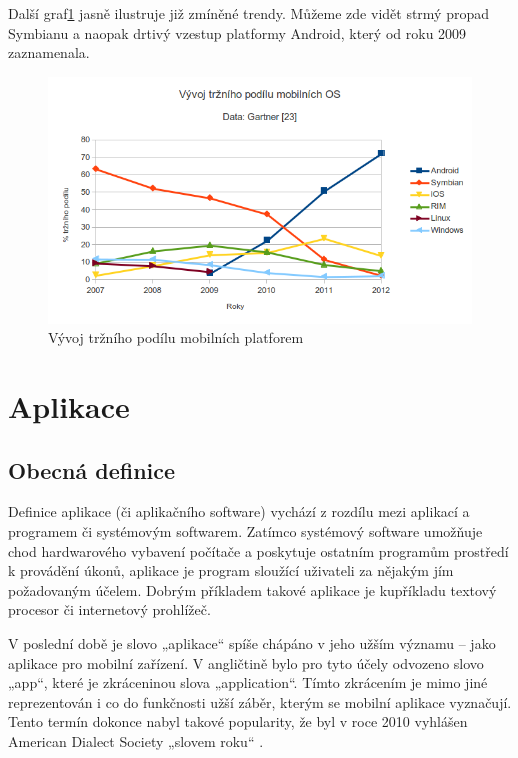 Další graf\ref{fig:MobilniPlatformyVyvoj} jasně ilustruje již zmíněné trendy. Můžeme zde vidět strmý propad Symbianu a naopak drtivý vzestup platformy Android, který od roku 2009 zaznamenala. 

\begin{figure}\centering
\includegraphics[width=1.0\textwidth]{graf_vyvoj_mobilnich_os.png}
\caption{Vývoj tržního podílu mobilních platforem}
\label{fig:MobilniPlatformyVyvoj}
\end{figure}

\section{Aplikace} \label{Sec:Aplikace}
\subsection{Obecná definice}
Definice aplikace (či aplikačního software) vychází z rozdílu mezi aplikací a programem či systémovým softwarem. Zatímco systémový software umožňuje chod hardwarového vybavení počítače a poskytuje ostatním programům prostředí k provádění úkonů, aplikace je program sloužící uživateli za nějakým jím požadovaným účelem. Dobrým příkladem takové aplikace je kupříkladu textový procesor či internetový prohlížeč.

V poslední době je slovo „aplikace“ spíše chápáno v jeho užším významu – jako aplikace pro mobilní zařízení. V angličtině bylo pro tyto účely odvozeno slovo „app“, které je zkráceninou slova „application“. Tímto zkrácením je mimo jiné reprezentován i co do funkčnosti užší záběr, kterým se mobilní aplikace vyznačují. Tento termín dokonce nabyl takové popularity, že byl v roce 2010 vyhlášen American Dialect Society „slovem roku“ \cite{app_word_of_the_year}.

